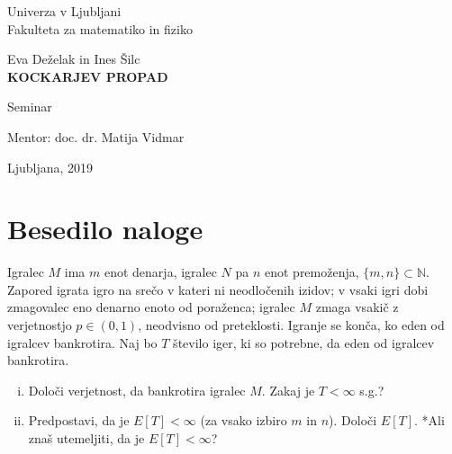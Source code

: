 \documentclass[12pt, a4paper]{article}
\begin{document}
\begin{titlepage}
\begin{center}

\large
Univerza v Ljubljani\\
\normalsize
Fakulteta za matematiko in fiziko\\

\vspace{3 cm} 

\large
Eva Deželak in Ines Šilc\\

\vspace{0.5cm}
\LARGE
\textbf{KOCKARJEV PROPAD}

\vspace{0.5 cm}
\normalsize
Seminar

\vspace{1.5cm}
\normalsize
Mentor: doc. dr. Matija Vidmar

\vspace{3cm}


\vfill

\large Ljubljana, 2019

\end{center}
\end{titlepage}

\newpage

\tableofcontents
\vspace{20mm}
\newpage
 \section[Besedilo naloge]{Besedilo naloge}



Igralec $M$ ima $m$ enot denarja, igralec $N$ pa $n$ enot premoženja, $\{m,n\}\subset \mathbb{N}$. Zapored igrata igro na srečo v kateri ni neodločenih izidov; v vsaki igri dobi zmagovalec eno denarno enoto od poraženca; igralec $M$ zmaga vsakič z verjetnostjo $p\in (0,1)$, neodvisno od preteklosti. Igranje se konča, ko eden od igralcev bankrotira. Naj bo $T$ število iger, ki so potrebne, da eden od igralcev bankrotira. 
\begin{enumerate}[(i)]
\item Določi verjetnost, da bankrotira igralec $M$. Zakaj je  $T<\infty$ s.g.?
\item Predpostavi, da je $E[T]<\infty$ (za vsako izbiro $m$ in $n$). Določi $E[T]$. *Ali znaš utemeljiti, da je $E[T]<\infty$?
\end{enumerate}
\end{document}
